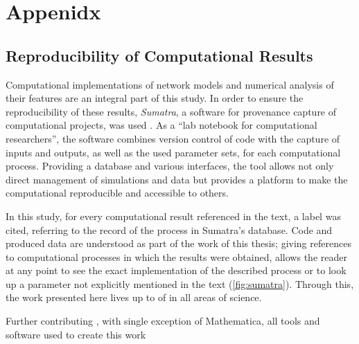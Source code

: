 



\chapter{Appenidx}





\section{Reproducibility of Computational Results}\label{sec:reproducibility}

Computational implementations of network models and numerical analysis
of their features are an integral part of this study. In order to
ensure the reproducibility of these results, \textit{Sumatra}, a
software for provenance capture of computational projects, was
used \parencite{Sumatra2012}. As a \enquote{lab notebook for
computational researchers}, the software combines version control of
code with the capture of inputs and outputs, as well as the used
parameter sets, for each computational process. Providing a database
and various interfaces, the tool allows not only direct management of
simulations and data but provides a platform to make the computational
reproducible and accessible to others.



In this study, for every computational result referenced  in the text, a label was cited, referring
to the record of the process in Sumatra's database. Code and produced
data are understood as part of the work of this thesis; giving
references to computational processes in which the results were
obtained, allows the reader at any point to see the exact
implementation of the described process or to look up a parameter not
explicitly mentioned in the text (\autoref{fig:sumatra}). Through this, the work presented
here lives up to of in all areas of science.


Further contributing , with single exception of Mathematica, all tools
and software used to create this work 


\newpage

